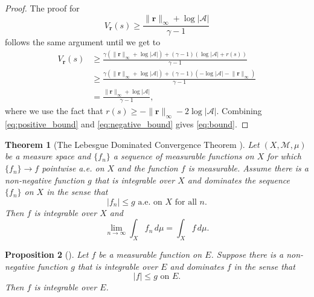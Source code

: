 \documentclass{article}
\newtheorem{theorem}{Theorem}[section]
\newtheorem{proposition}[theorem]{Proposition}
\theoremstyle{definition}
\newtheorem{definition}[theorem]{Definition}
\newcommand{\rinf}{\lVert \mathbf{r} \rVert_\infty}
\begin{document}
\begin{proof}
  The proof for
  \begin{equation} \label{eq:negative_bound}
    V_{\mathbf{r}}(s) \ge \frac{\rinf + \log|\mathcal{A}|}{\gamma - 1}
  \end{equation}
  follows the same argument until we get to
  \[
    \begin{split}
      V_{\mathbf{r}}(s) &\ge \frac{\gamma(\rinf + \log|\mathcal{A}|) + (\gamma -
        1)(\log|\mathcal{A}| + r(s))}{\gamma - 1} \\
      &\ge \frac{\gamma(\rinf + \log|\mathcal{A}|) + (\gamma -
        1)(-\log|\mathcal{A}| -\rinf)}{\gamma - 1} \\
      &= \frac{\rinf + \log|\mathcal{A}|}{\gamma - 1},
    \end{split}
  \]
  where we use the fact that $r(s) \ge -\rinf - 2\log|\mathcal{A}|$. Combining
  \eqref{eq:positive_bound} and \eqref{eq:negative_bound} gives
  \eqref{eq:bound}.
\end{proof}

\begin{theorem}[The Lebesgue Dominated Convergence Theorem
  \cite{royden2010real}] \label{thm:lebesgue}
  Let $(X, \mathcal{M}, \mu)$ be a measure space and $\{ f_n \}$ a sequence of
  measurable functions on $X$ for which $\{ f_n \} \to f$ pointwise a.e. on $X$
  and the function $f$ is measurable. Assume there is a non-negative function
  $g$ that is integrable over $X$ and dominates the sequence $\{ f_n \}$ on $X$
  in the sense that
  \[ |f_n| \le g \text{ a.e. on $X$ for all $n$.} \]
  Then $f$ is integrable over $X$ and
  \[ \lim_{n \to \infty} \int_X f_n\,d\mu = \int_X f\,d\mu. \]
\end{theorem}


\begin{proposition}[\cite{royden2010real}]
  Let $f$ be a measurable function on $E$. Suppose there is a non-negative
  function $g$ that is integrable over $E$ and dominates $f$ in the sense that
  \[ |f| \le g \text{ on } E. \]
  Then $f$ is integrable over $E$.
\end{proposition}
\end{document}
